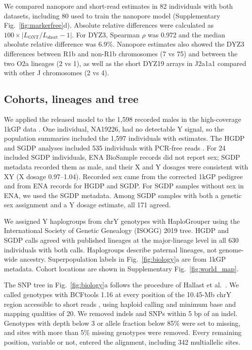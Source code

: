 We compared nanopore and short-read estimates in 82 individuals with both datasets, including 80 used to train the nanopore model (Supplementary Fig.~\ref{fig:markerfree}d). Absolute relative differences were calculated as $100 \times |L_{\mathrm{ONT}}/L_{\mathrm{short}}-1|$. For DYZ3, Spearman $\rho$ was 0.972 and the median absolute relative difference was 6.9\%. Nanopore estimates also showed the DYZ3 differences between R1b and non-R1b chromosomes (7 vs 75) and between the two O2a lineages (2 vs 1), as well as the short DYZ19 arrays in J2a1a1 compared with other J chromosomes (2 vs 4).

\subsection{Cohorts, lineages and tree}\label{sec:m-population}
We applied the released model to the 1,598 recorded males in the high-coverage 1kGP data \cite{ByrskaBishop2022}. One individual, NA19226, had no detectable Y signal, so the population summaries included the 1,597 individuals with estimates. The HGDP and SGDP analyses included 535 individuals with PCR-free reads \cite{Bergstrom2020,Mallick2016}. For 24 included SGDP individuals, ENA BioSample records did not report sex; SGDP metadata recorded them as male, and their X and Y dosages were consistent with XY (X dosage 0.97--1.04). Recorded sex came from the corrected 1kGP pedigree and from ENA records for HGDP and SGDP. For SGDP samples without sex in ENA, we used the SGDP metadata. Among SGDP samples with both a genetic sex assignment and a Y dosage estimate, all 171 agreed.

We assigned Y haplogroups from chrY genotypes with HaploGrouper \cite{Jagadeesan2021} using the International Society of Genetic Genealogy (ISOGG) 2019 tree. HGDP and SGDP calls agreed with published lineages \cite{Hallast2021} at the major-lineage level in all 630 individuals with both calls. Haplogroups describe paternal lineages, not genome-wide ancestry. Superpopulation labels in Fig.~\ref{fig:biology}a are from 1kGP metadata. Cohort locations are shown in Supplementary Fig.~\ref{fig:world_map}.

The SNP tree in Fig.~\ref{fig:biology}a follows the procedure of Hallast et al.\ \cite{Hallast2026}. We called genotypes with BCFtools 1.16 \cite{Danecek2021} at every position of the 10.45-Mb chrY region accessible to short reads \cite{Poznik2013}, using haploid calling and minimum base and mapping qualities of 20. We removed indels and SNPs within 5 bp of an indel. Genotypes with depth below 3 or allele fraction below 85\% were set to missing, and sites with more than 5\% missing genotypes were removed. Every remaining position, variable or not, entered the alignment, including 342 multiallelic sites.

